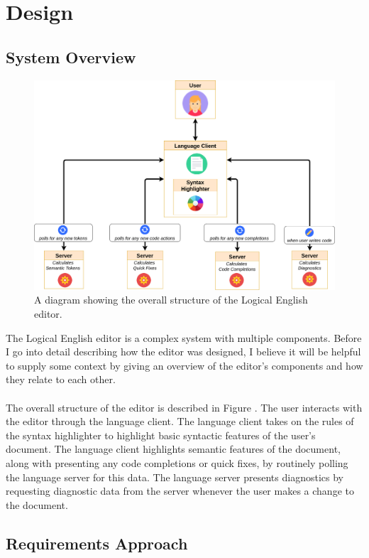 \documentclass[../main.tex]{subfiles}
\begin{document}
\chapter{Design}
\section{System Overview}
\begin{figure}[h!]
\centering
\includegraphics[width = \linewidth]{./figures/le-editor.png}
\caption{A diagram showing the overall structure of the Logical English editor.}
\label{fig:system-overview}
\end{figure}
The Logical English editor is a complex system with multiple components. Before I go into detail describing how the editor was designed, I believe it will be helpful to supply some context by giving an overview of the editor's components and how they relate to each other.
\\
\\
The overall structure of the editor is described in Figure \cite{fig:system-overview}. The user interacts with the editor through the language client. The language client takes on the rules of the syntax highlighter to highlight basic syntactic features of the user's document. The language client highlights semantic features of the document, along with presenting any code completions or quick fixes, by routinely polling the language server for this data. The language server presents diagnostics by requesting diagnostic data from the server whenever the user makes a change to the document.

\section{Requirements Approach}
\end{document}
